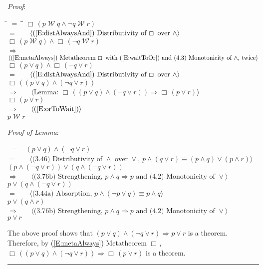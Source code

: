 \documentclass[12pt, fleqn, leqno]{article}
\newcommand{\lgap}{2pt}                             %
\newcommand{\mymathindent}{24pt}                    %
\newcommand{\impl}{\ensuremath{\Rightarrow}}        %
\newcommand{\Wait}{\;\mathcal{W}\;}
\newcommand{\Always}{\Box\,}
\newcommand{\myqed}{\rule[-.23ex]{1.2ex}{2.0ex}}
\newcommand{\myqedtab}{\hspace{384pt}}              %
\newcommand{\Gll} {\langle}                         %
\newcommand{\Ggg} {\rangle}                         %
\newcommand{\Hint}[1]     {\ \ \ $\Gll              \mbox{#1} \Ggg$ }   %
\begin{document}
\emph{Proof}:
\begin{tabbing}
\hspace{\mymathindent} \= $= \;$ \= \myqedtab \= \kill
  \> \>   $\Always (p \Wait q \land \neg q \Wait r)$\\[\lgap]
  \> $=$ \> \Hint{(\ref{E:distAlwaysAnd}) Distributivity of $\Always$ over $\land$}\\[\lgap]
  \> \>   $\Always (p \Wait q) \land \Always(\neg q \Wait r)$\\[\lgap]
  \> $\impl$  \>  \Hint{(\ref{E:metaAlways}) Metatheorem $\Always$ with (\ref{E:waitToOr}) and (4.3) Monotonicity of $\land$, twice}\\[\lgap]
  \> \>   $\Always (p \lor q) \land \Always(\neg q \lor r)$\\[\lgap]
  \> $=$ \> \Hint{(\ref{E:distAlwaysAnd}) Distributivity of $\Always$ over $\land$}\\[\lgap]
  \> \>   $\Always ((p \lor q) \land (\neg q \lor r))$\\[\lgap]
  \> $\impl$  \>  \Hint{Lemma: $\Always ((p \lor q) \land (\neg q \lor r))\impl \Always(p\lor r)$}\\[\lgap]
  \> \>   $\Always (p \lor r)$\\[\lgap]
  \> $\impl$  \>  \Hint{(\ref{E:orToWait})}\\[\lgap]
  \> \>   $p\Wait r$
\end{tabbing}

\emph{Proof of Lemma}:
\begin{tabbing}
\hspace{\mymathindent} \= $= \;$ \= \myqedtab \= \kill
  \> \>   $(p\lor q)\land (\neg q\lor r)$\\[\lgap]
  \> $=$  \>  \Hint{(3.46) Distributivity of $\land$ over $\lor$, $p\land(q\lor r) \equiv (p\land q)\lor (p\land r)$}\\[\lgap]
  \> \>   $(p\land (\neg q\lor r))\lor (q\land (\neg q\lor r))$\\[\lgap]
  \> $\impl$  \>  \Hint{(3.76b) Strengthening, $p\land q \impl p$ and (4.2) Monotonicity of $\lor$}\\[\lgap]
  \> \>   $p\lor (q\land (\neg q\lor r))$\\[\lgap]
  \> $=$  \>  \Hint{(3.44a) Absorption, $p\land (\neg p\lor q)\equiv p\land q$}\\[\lgap]
  \> \>   $p\lor (q\land r)$\\[\lgap]
  \> $\impl$  \>  \Hint{(3.76b) Strengthening, $p\land q \impl p$ and (4.2) Monotonicity of $\lor$}\\[\lgap]
  \> \>   $p\lor r$
\end{tabbing}
The above proof shows that $(p\lor q)\land (\neg q\lor r) \impl p\lor r$ is a theorem.
Therefore, by (\ref{E:metaAlways}) Metatheorem $\Always$, $\Always ((p\lor q)\land (\neg q\lor r)) \impl \Always (p\lor r)$ is a theorem. \quad \myqed
\end{document}
